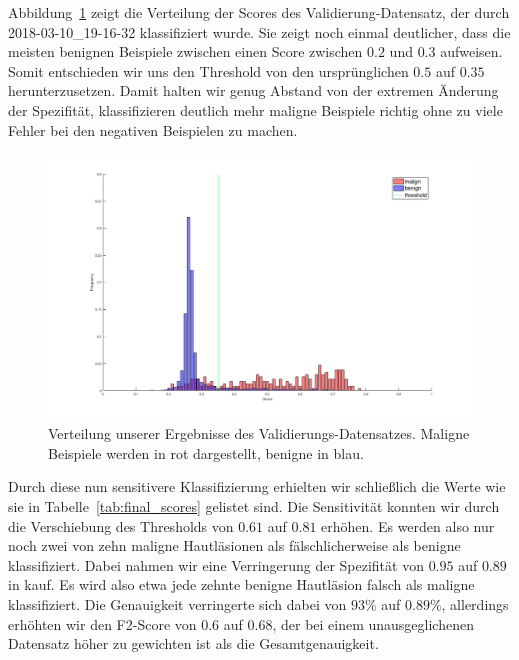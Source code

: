 Abbildung~\ref{fig:verteilung} zeigt die Verteilung der Scores des Validierung-Datensatz, der durch 2018-03-10\_19-16-32 klassifiziert wurde. Sie zeigt noch einmal deutlicher, dass die meisten benignen Beispiele zwischen einen Score zwischen $0.2$ und $0.3$ aufweisen. Somit entschieden wir uns den Threshold von den ursprünglichen $0.5$ auf $0.35$ herunterzusetzen. Damit halten wir genug Abstand von der extremen Änderung der Spezifität, klassifizieren deutlich mehr maligne Beispiele richtig ohne zu viele Fehler bei den negativen Beispielen zu machen. 

\begin{figure}[htb!]
	\begin{center}
		\includegraphics[width=\textwidth]{./pics/threshold/score_threshold.png}
		\caption{Verteilung unserer Ergebnisse des Validierungs-Datensatzes. Maligne Beispiele werden in rot dargestellt, benigne in blau.}
		\label{fig:verteilung}
    \end{center}
\end{figure}


Durch diese nun sensitivere Klassifizierung erhielten wir schließlich die Werte wie sie in Tabelle~\ref{tab:final_scores} gelistet sind. Die Sensitivität konnten wir durch die Verschiebung des Thresholds von $0.61$ auf $0.81$ erhöhen. Es werden also nur noch zwei von zehn maligne Hautläsionen als fälschlicherweise als benigne klassifiziert. Dabei nahmen wir eine Verringerung der Spezifität von $0.95$ auf $0.89$ in kauf. Es wird also etwa jede zehnte benigne Hautläsion falsch als maligne klassifiziert. Die Genauigkeit verringerte sich dabei von $93\%$ auf $0.89\%$, allerdings erhöhten wir den F2-Score von $0.6$ auf $0.68$, der bei einem unausgeglichenen Datensatz höher zu gewichten ist als die Gesamtgenauigkeit.

